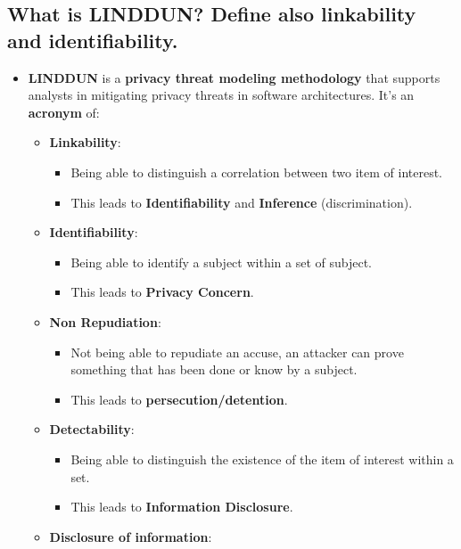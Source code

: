 \documentclass[9pt, letterpaper]{article}
\begin{document}
\subsection{What is LINDDUN? Define also linkability and identifiability.}
\begin{itemize}
	\item \textbf{LINDDUN} is a \textbf{privacy threat modeling methodology} that supports analysts in mitigating privacy threats in software architectures. It's an \textbf{acronym} of:
	      \begin{itemize}
		      \item \textbf{Linkability}:
		            \begin{itemize}
			            \item Being able to distinguish a correlation between two item of interest.
			            \item This leads to \textbf{Identifiability} and \textbf{Inference} (discrimination).
		            \end{itemize}
		      \item \textbf{Identifiability}:
		            \begin{itemize}
			            \item Being able to identify a subject within a set of subject.
			            \item This leads to \textbf{Privacy Concern}.
		            \end{itemize}
		      \item \textbf{Non Repudiation}:
		            \begin{itemize}
			            \item Not being able to repudiate an accuse, an attacker can prove something that has been done or know by a subject.
			            \item This leads to \textbf{persecution/detention}.
		            \end{itemize}
		      \item \textbf{Detectability}:
		            \begin{itemize}
			            \item Being able to distinguish the existence of the item of interest within a set.
			            \item This leads to \textbf{Information Disclosure}.
		            \end{itemize}
		      \item \textbf{Disclosure of information}:
		            \begin{itemize}

\end{itemize}
\end{itemize}
\end{itemize}
\end{document}
